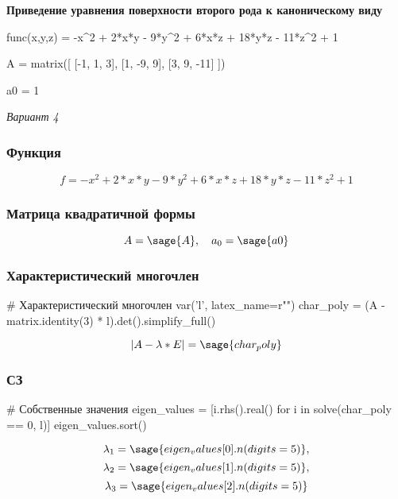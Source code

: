 \begin{center}
\large{\textbf{Приведение уравнения поверхности второго рода к каноническому виду}}
\end{center}

\begin{sagesilent}
	func(x,y,z) = -x^2 + 2*x*y - 9*y^2 + 6*x*z + 18*y*z - 11*z^2 + 1
	
	A = matrix([
    [-1, 1, 3],
    [1, -9, 9],
    [3, 9, -11]
])

a0 = 1
    
\end{sagesilent}

\textit{Вариант 4}

\subsubsection{Функция}
$$f = -x^2 + 2*x*y - 9*y^2 + 6*x*z + 18*y*z - 11*z^2 + 1$$

\subsubsection{Матрица квадратичной формы}
\begin{equation*}
A = \sage{A}, \quad a_0 = \sage{a0}
\end{equation*}

\subsubsection{Характеристический многочлен}
\begin{sagesilent}
# Характеристический многочлен
var('l', latex_name=r"\lambda")
char_poly = (A - matrix.identity(3) * l).det().simplify_full()
\end{sagesilent}
$$|A - \lambda * E| = \sage{char_poly}$$

\subsubsection{СЗ}
\begin{sagesilent}
# Собственные значения
eigen_values = [i.rhs().real() for i in solve(char_poly == 0, l)]
eigen_values.sort()
\end{sagesilent}
$$\lambda_1 = \sage{eigen_values[0].n(digits = 5)},$$
$$\lambda_2 = \sage{eigen_values[1].n(digits = 5)},$$
$$\lambda_3 = \sage{eigen_values[2].n(digits = 5)}$$

    

